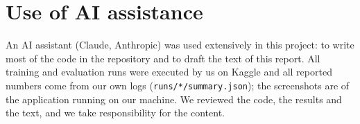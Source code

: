 \documentclass[12pt,a4paper]{article}
\begin{document}
\section{Use of AI assistance}
\label{app:ai}
An AI assistant (Claude, Anthropic) was used extensively in this project: to write most of the code in the repository and to draft the text of this report. All training and evaluation runs were executed by us on Kaggle and all reported numbers come from our own logs (\texttt{runs/*/summary.json}); the screenshots are of the application running on our machine. We reviewed the code, the results and the text, and we take responsibility for the content.
\end{document}
